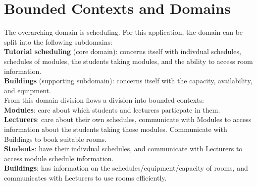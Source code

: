 \section{Bounded Contexts and Domains}

The overarching domain is scheduling. For this application, the domain can be split into the following subdomains: \\
\textbf{Tutorial scheduling} (core domain): concerns itself with indivdual schedules, schedules of modules, the students taking modules, and the ability to access room information. \\
\textbf{Buildings} (supporting subdomain): concerns itself with the capacity, availability, and equipment. \\

From this domain division flows a division into bounded contexts: \\

\textbf{Modules}: care about which students and lecturers particpate in them. \\
\textbf{Lecturers}: care about their own schedules, communicate with Modules to access information about the students taking those modules. Communicate with Buildings to book suitable rooms. \\
\textbf{Students}: have their indivdual schedules, and communicate with Lecturers to access module schedule information. \\
\textbf{Buildings}: has information on the schedules/equipment/capacity of rooms, and communicates with Lecturers to use rooms efficiently.
